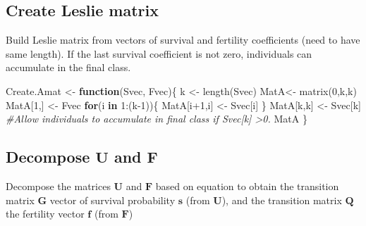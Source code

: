 \documentclass[
]{book}
\newenvironment{Shaded}{\begin{snugshade}}{\end{snugshade}}
\newcommand{\CommentTok}[1]{\textcolor[rgb]{0.56,0.35,0.01}{\textit{#1}}}
\newcommand{\ControlFlowTok}[1]{\textcolor[rgb]{0.13,0.29,0.53}{\textbf{#1}}}
\newcommand{\DecValTok}[1]{\textcolor[rgb]{0.00,0.00,0.81}{#1}}
\newcommand{\FunctionTok}[1]{\textcolor[rgb]{0.00,0.00,0.00}{#1}}
\newcommand{\NormalTok}[1]{#1}
\newcommand{\OtherTok}[1]{\textcolor[rgb]{0.56,0.35,0.01}{#1}}
\newcommand{\SpecialCharTok}[1]{\textcolor[rgb]{0.00,0.00,0.00}{#1}}
\begin{document}
\hypertarget{create-leslie-matrix}{%
\subsection{Create Leslie matrix}\label{create-leslie-matrix}}

Build Leslie matrix from vectors of survival and fertility coefficients (need to have same length). If the last survival coefficient is not zero, individuals can accumulate in the final class.

\begin{Shaded}
\begin{Highlighting}[]
\NormalTok{Create.Amat }\OtherTok{\textless{}{-}} \ControlFlowTok{function}\NormalTok{(Svec, Fvec)\{}
\NormalTok{  k }\OtherTok{\textless{}{-}} \FunctionTok{length}\NormalTok{(Svec)}
\NormalTok{  MatA}\OtherTok{\textless{}{-}} \FunctionTok{matrix}\NormalTok{(}\DecValTok{0}\NormalTok{,k,k)}
\NormalTok{  MatA[}\DecValTok{1}\NormalTok{,] }\OtherTok{\textless{}{-}}\NormalTok{ Fvec }
  \ControlFlowTok{for}\NormalTok{(i }\ControlFlowTok{in} \DecValTok{1}\SpecialCharTok{:}\NormalTok{(k}\DecValTok{{-}1}\NormalTok{))\{}
\NormalTok{    MatA[i}\SpecialCharTok{+}\DecValTok{1}\NormalTok{,i] }\OtherTok{\textless{}{-}}\NormalTok{ Svec[i]}
\NormalTok{  \}}
\NormalTok{  MatA[k,k] }\OtherTok{\textless{}{-}}\NormalTok{ Svec[k] }\CommentTok{\#Allow individuals to accumulate in final class if Svec[k] \textgreater{}0.}
\NormalTok{  MatA}
\NormalTok{  \}}
\end{Highlighting}
\end{Shaded}

\hypertarget{decompose-mathbfu-and-mathbff}{%
\subsection{\texorpdfstring{Decompose \(\mathbf{U}\) and \(\mathbf{F}\)}{Decompose \textbackslash mathbf\{U\} and \textbackslash mathbf\{F\}}}\label{decompose-mathbfu-and-mathbff}}

Decompose the matrices \(\mathbf{U}\) and \(\mathbf{F}\) based on equation to obtain the transition matrix \(\mathbf{G}\) vector of survival probability \(\mathbf{s}\) (from \(\mathbf{U}\)), and the transition matrix \(\mathbf{Q}\) the fertility vector \(\mathbf{f}\) (from \(\mathbf{F}\))
\end{document}
